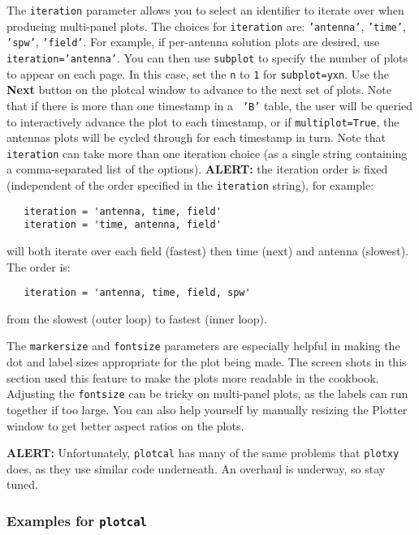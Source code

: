 The {\tt iteration} parameter allows you to select an identifier to
iterate over when producing multi-panel plots.  The choices
for {\tt iteration} are: {\tt 'antenna'}, {\tt 'time'}, 
{\tt 'spw'}, {\tt 'field'}.  For example, if per-antenna solution 
plots are desired, use {\tt iteration='antenna'}.  You can then use
{\tt  subplot} to specify the number of plots to appear on each page.
In this case, set the {\tt n} to {\tt 1} for {\tt subplot=yxn}.  
Use the {\bf Next} button on the plotcal window to advance to the next
set of plots.  Note that if there is more than one timestamp in a {\tt
'B'} table, the user will be queried to interactively advance the plot
to each timestamp, or if {\tt multiplot=True}, the antennas plots will
be cycled through for each timestamp in turn.  Note that 
{\tt iteration} can take more than one iteration choice (as a single
string containing a comma-separated list of the options).
{\bf ALERT:} the iteration order is fixed (independent of the
order specified in the {\tt iteration} string), for example:
\small
\begin{verbatim}
   iteration = 'antenna, time, field'
   iteration = 'time, antenna, field'
\end{verbatim}
\normalsize
will both iterate over each field (fastest) then time (next) and antenna
(slowest).  The order is:
\small
\begin{verbatim}
   iteration = 'antenna, time, field, spw'
\end{verbatim}
\normalsize
from the slowest (outer loop) to fastest (inner loop).

The {\tt markersize} and {\tt fontsize} parameters are especially
helpful in making the dot and label sizes appropriate for the
plot being made.  The screen shots in this section used this feature
to make the plots more readable in the cookbook.  Adjusting the
{\tt fontsize} can be tricky on multi-panel plots, as the labels
can run together if too large.  You can also help yourself by manually
resizing the Plotter window to get better aspect ratios on the plots.

{\bf ALERT:} Unfortunately, {\tt plotcal} has many of the same
problems that {\tt plotxy} does, as they use similar code underneath.
An overhaul is underway, so stay tuned.

\subsubsection{Examples for {\tt plotcal}}
\label{section:cal.tables.plotcal.examples}

